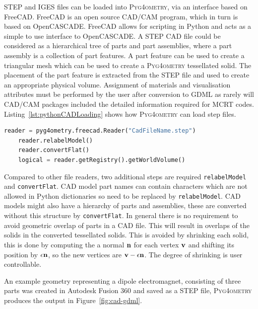\documentclass[final,5p,times,twocolumn]{elsarticle}
\newcommand{\pyinline}[1]{\lstinline[postbreak={}]{#1}}
\newcommand{\PYGEOMETRY}{\textsc{Pyg4ometry}}
\begin{document}
STEP and IGES files can be loaded into \PYGEOMETRY{}, via an interface 
based on FreeCAD. FreeCAD is an open source CAD/CAM program, which 
in turn is based on OpenCASCADE. FreeCAD allows for scripting in Python 
and acts as a simple to use interface to OpenCASCADE.  A STEP CAD file 
could be considered as a hierarchical tree of parts and part assemblies, 
where a part assembly is a collection of part features. A part feature can be used 
to create a triangular mesh which can be used to create a \PYGEOMETRY{} tessellated solid. The placement 
of the part feature is extracted from the STEP file and used to create an 
appropriate physical volume. Assignment of materials and visualisation 
attributes must be performed by  the user after conversion to GDML as rarely 
will CAD/CAM packages included the detailed information required for MCRT 
codes. Listing~\ref{lst:pythonCADLoading} shows 
how \PYGEOMETRY{} can load step files.
\begin{lstlisting}[caption={A simple \PYGEOMETRY{} Python script to load a STEP file.},label={lst:pythonCADLoading}, language=Python]
    reader = pyg4ometry.freecad.Reader("CadFileName.step")
    reader.relabelModel()
    reader.convertFlat()
    logical = reader.getRegistry().getWorldVolume()
\end{lstlisting}
Compared to other file readers, two additional steps are required \pyinline{relabelModel} and \pyinline{convertFlat}. CAD model 
part names can contain characters which are not allowed in Python dictionaries so need to be replaced by \pyinline{relabelModel}. 
CAD models might also have a hierarchy of parts and assemblies, these are converted without this structure by \pyinline{convertFlat}.
In general there is no requirement to avoid geometric overlap  of parts in a CAD file. This will result in overlaps of the solids in 
the converted tessellated solids. This is avoided by shrinking each solid, this is done by computing the a normal ${\bf n}$  for each 
vertex ${\bf v}$ and shifting its position by $\epsilon {\bf n}$, so the new vertices are ${\bf v} - \epsilon {\bf n}$. The degree of shrinking 
is user controllable. 

An example geometry representing a dipole electromagnet, consisting of three parts was created in Autodesk Fusion 360
and saved as a STEP file, \PYGEOMETRY{} produces the output in Figure~\ref{fig:cad-gdml}.
\end{document}
